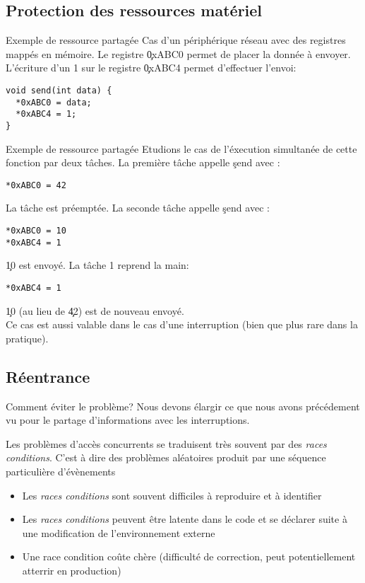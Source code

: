 \subsection{Protection des ressources matériel}

\begin{frame}[fragile]{Exemple de ressource partagée}
  Cas d'un  périphérique réseau avec des registres  mappés en mémoire.
  Le  registre  \c{0xABC0}  permet  de  placer la  donnée  à  envoyer.
  L'écriture  d'un 1  sur  le registre  \c{0xABC4} permet  d'effectuer
  l'envoi:
\begin{lstlisting}
void send(int data) {
  *0xABC0 = data;
  *0xABC4 = 1;
}
  \end{lstlisting}
\end{frame}

\begin{frame}[fragile]{Exemple de ressource partagée}
  Etudions le cas de l'éxecution simultanée de cette fonction par deux
  tâches.  La première tâche appelle \c{send} avec :
  \begin{lstlisting}
*0xABC0 = 42
  \end{lstlisting}
  La  tâche est  préemptée.  La  seconde tâche  appelle  \c{send} avec
  :
\begin{lstlisting}
*0xABC0 = 10
*0xABC4 = 1
\end{lstlisting}
  \c{10} est envoyé. La tâche 1 reprend la main:
\begin{lstlisting}
*0xABC4 = 1
\end{lstlisting}
  \c{10} (au lieu de \c{42}) est de nouveau envoyé.\\[3mm]

  Ce cas  est aussi valable dans  le cas d'une  interruption (bien que
  plus rare dans la pratique).
\end{frame}

\subsection{Réentrance}

\begin{frame}{Comment éviter le problème?}
  Nous devons élargir ce que nous avons précédement vu pour le partage
  d'informations avec les interruptions.

  Les problèmes d'accès concurrents se traduisent très souvent par des
  \emph{races  conditions}.   C'est à  dire  des problèmes  aléatoires
  produit par une séquence particulière d'évènements
  \begin{itemize}
  \item   Les  \emph{races  conditions}   sont  souvent   difficiles  à
    reproduire et à identifier
  \item Les  \emph{races conditions} peuvent être latente  dans le code
    et se déclarer suite à une modification de l'environnement externe
  \item Une race condition coûte chère (difficulté de correction, peut
    potentiellement atterrir en production)
  \end{itemize}
\end{frame}

